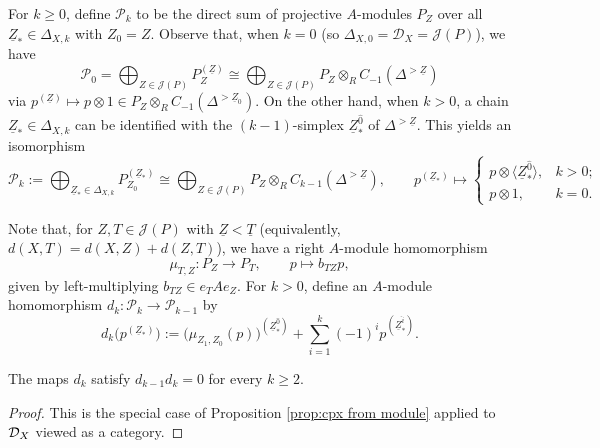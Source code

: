 \documentclass[a4paper,leqno]{amsart}
\begin{document}
For $k\geq0$, define $\mathcal{P}_k$ to be the direct sum of projective $A$-modules $P_Z$ over all $\underline{Z}_\ast\in\Delta_{X,k}$ with $Z_0 = Z$. Observe that, when $k=0$ (so $\Delta_{X,0}=\mathcal{D}_X=\mathcal{J}(P)$), we have
\[
\mathcal{P}_0 = \bigoplus_{Z\in\mathcal{J}(P)} P_Z^{(\underline{Z})} \cong \bigoplus_{Z\in\mathcal{J}(P)} P_Z\otimes_{R} C_{-1}(\Delta^{>\underline{Z}})\]
via $p^{(\underline{Z})}\mapsto p\otimes 1\in P_Z\otimes_{R}C_{-1}(\Delta^{>\underline{Z}_0})$. On the other hand, when $k>0$, a chain $\underline{Z}_\ast \in \Delta_{X,k}$ can be identified with the $(k-1)$-simplex $\underline{Z}_\ast^{\widehat{0}}$ of $\Delta^{>\underline{Z}}$. This yields an isomorphism
\begin{equation}
\mathcal P_k := \bigoplus_{\underline{Z}_\ast\in \Delta_{X,k}} P_{Z_0}^{(\underline{Z}_\ast)} \cong
\bigoplus_{Z\in\mathcal J(P)}
P_Z\otimes_{R}C_{k-1}(\Delta^{>\underline{Z}}), \qquad  p^{(\underline{Z}_\ast)} \mapsto \begin{cases}
    p\otimes \langle \underline{Z}_\ast^{\widehat{0}} \rangle, & k>0;\\ p\otimes 1, & k=0.
\end{cases}
\label{eq:candidate-terms}
\end{equation}

Note that, for $Z,T\in\mathcal J(P)$ with $\underline{Z}<\underline{T}$ (equivalently, $d(X,T)=d(X,Z)+d(Z,T)$), we have a right $A$-module homomorphism
$$\mu_{T,Z}\colon P_Z\longrightarrow P_T, \qquad p\longmapsto b_{TZ}p,$$ given by left-multiplying $b_{TZ}\in e_TA e_Z$.
For $k>0$, define an $A$-module homomorphism $d_k\colon\mathcal P_k\longrightarrow\mathcal P_{k-1}$ by
\begin{equation}
 d_k\bigl(p^{(\underline{Z}_\ast)}\bigr)
:=
\bigl(\mu_{Z_1,Z_0}(p)\bigr)^{(\underline{Z}_\ast^{\widehat{0}})}
+ \sum_{i=1}^k
(-1)^i  p^{(\underline{Z}_\ast^{\widehat{i}})}.
 \label{eq:candidate-differential}
\end{equation}

\begin{prop}\label{prop:resolution-differential}
The maps $d_k$ satisfy $d_{k-1}d_k=0$ for every $k\geq2$.
\end{prop}
\begin{proof}
This is the special case of Proposition \ref{prop:cpx from module} applied to $\mathcal D_X$ viewed as a category.
\end{proof}
\end{document}
